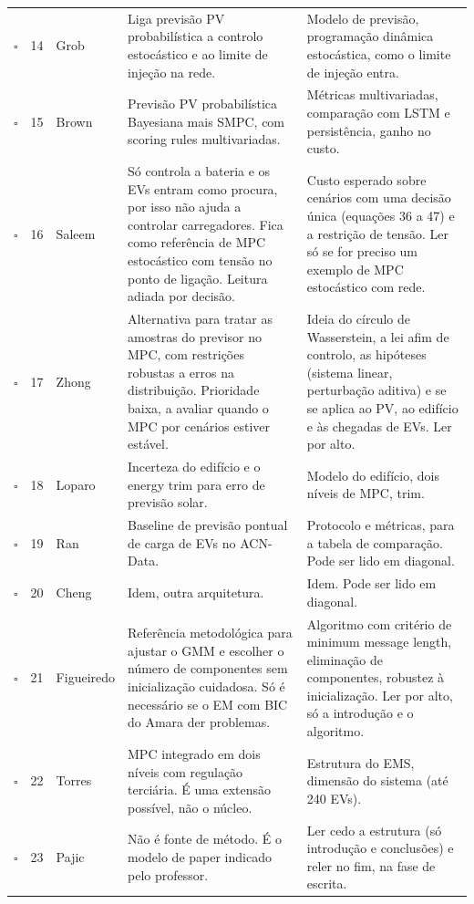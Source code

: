 \documentclass[11pt,a4paper]{article}
\newcommand{\ckN}{$\square$}  %
\begin{document}
\begin{center}
\begin{longtable}{@{}c r P{1.9cm} P{5.0cm} P{5.9cm}@{}}
\ckN & 14 & Grob & Liga previsão PV probabilística a controlo estocástico e ao limite de injeção na rede. & Modelo de previsão, programação dinâmica estocástica, como o limite de injeção entra. \\
\ckN & 15 & Brown & Previsão PV probabilística Bayesiana mais SMPC, com scoring rules multivariadas. & Métricas multivariadas, comparação com LSTM e persistência, ganho no custo. \\
\ckN & 16 & Saleem & Só controla a bateria e os EVs entram como procura, por isso não ajuda a controlar carregadores. Fica como referência de MPC estocástico com tensão no ponto de ligação. Leitura adiada por decisão. & Custo esperado sobre cenários com uma decisão única (equações 36 a 47) e a restrição de tensão. Ler só se for preciso um exemplo de MPC estocástico com rede. \\
\ckN & 17 & Zhong & Alternativa para tratar as amostras do previsor no MPC, com restrições robustas a erros na distribuição. Prioridade baixa, a avaliar quando o MPC por cenários estiver estável. & Ideia do círculo de Wasserstein, a lei afim de controlo, as hipóteses (sistema linear, perturbação aditiva) e se se aplica ao PV, ao edifício e às chegadas de EVs. Ler por alto. \\
\ckN & 18 & Loparo & Incerteza do edifício e o energy trim para erro de previsão solar. & Modelo do edifício, dois níveis de MPC, trim. \\
\ckN & 19 & Ran & Baseline de previsão pontual de carga de EVs no ACN-Data. & Protocolo e métricas, para a tabela de comparação. Pode ser lido em diagonal. \\
\ckN & 20 & Cheng & Idem, outra arquitetura. & Idem. Pode ser lido em diagonal. \\
\ckN & 21 & Figueiredo & Referência metodológica para ajustar o GMM e escolher o número de componentes sem inicialização cuidadosa. Só é necessário se o EM com BIC do Amara der problemas. & Algoritmo com critério de minimum message length, eliminação de componentes, robustez à inicialização. Ler por alto, só a introdução e o algoritmo. \\
\ckN & 22 & Torres & MPC integrado em dois níveis com regulação terciária. É uma extensão possível, não o núcleo. & Estrutura do EMS, dimensão do sistema (até 240 EVs). \\
\ckN & 23 & Pajic & Não é fonte de método. É o modelo de paper indicado pelo professor. & Ler cedo a estrutura (só introdução e conclusões) e reler no fim, na fase de escrita. \\
\bottomrule
\end{longtable}
\end{center}
\end{document}
